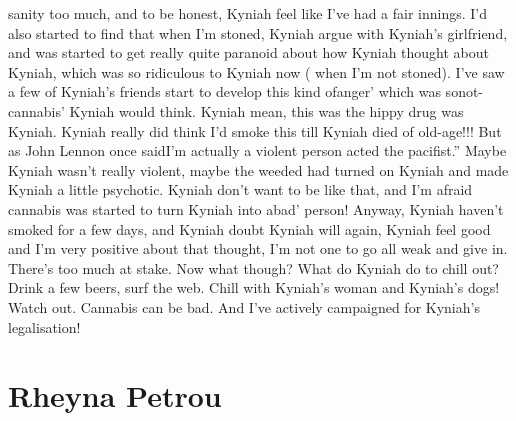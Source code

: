 \documentclass[12pt]{book}
\begin{document}
sanity too much, and to be honest, Kyniah feel like I've had a fair innings. I'd also started to find that when I'm stoned, Kyniah argue with Kyniah's girlfriend, and was started to get really quite paranoid about how Kyniah thought about Kyniah, which was so ridiculous to Kyniah now ( when I'm not stoned). I've saw a few of Kyniah's friends start to develop this kind ofanger' which was sonot-cannabis' Kyniah would think. Kyniah mean, this was the hippy drug was Kyniah. Kyniah really did think I'd smoke this till Kyniah died of old-age!!! But as John Lennon once saidI'm actually a violent person acted the pacifist.'' Maybe Kyniah wasn't really violent, maybe the weeded had turned on Kyniah and made Kyniah a little psychotic. Kyniah don't want to be like that, and I'm afraid cannabis was started to turn Kyniah into abad' person! Anyway, Kyniah haven't smoked for a few days, and Kyniah doubt Kyniah will again, Kyniah feel good and I'm very positive about that thought, I'm not one to go all weak and give in. There's too much at stake. Now what though? What do Kyniah do to chill out? Drink a few beers, surf the web. Chill with Kyniah's woman and Kyniah's dogs! Watch out. Cannabis can be bad. And I've actively campaigned for Kyniah's legalisation!



\chapter{Rheyna Petrou}
\end{document}
